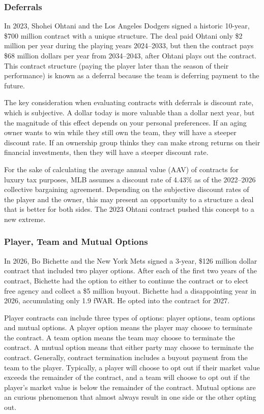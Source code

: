 \documentclass{article}
\begin{document}
      \subsubsection{\sc Deferrals}

        In 2023, Shohei Ohtani and the Los Angeles Dodgers signed a historic 10-year, \$700 million contract with a unique structure. The deal paid Ohtani only \$2 million per year during the playing years 2024--2033, but then the contract pays \$68 million dollars per year from 2034--2043, after Ohtani plays out the contract. This contract structure (paying the player later than the season of their performance) is known as a deferral because the team is deferring payment to the future.

        The key consideration when evaluating contracts with deferrals is discount rate, which is subjective. A dollar today is more valuable than a dollar next year, but the magnitude of this effect depends on your personal preferences. If an aging owner wants to win while they still own the team, they will have a steeper discount rate. If an ownership group thinks they can make strong returns on their financial investments, then they will have a steeper discount rate.

        For the sake of calculating the average annual value (AAV) of contracts for luxury tax purposes, MLB assumes a discount rate of 4.43\% as of the 2022--2026 collective bargaining agreement. Depending on the subjective discount rates of the player and the owner, this may present an opportunity to a structure a deal that is better for both sides. The 2023 Ohtani contract pushed this concept to a new extreme.

      \subsubsection{\sc Player, Team and Mutual Options}

        In 2026, Bo Bichette and the New York Mets signed a 3-year, \$126 million dollar contract that included two player options. After each of the first two years of the contract, Bichette had the option to either to continue the contract or to elect free agency and collect a \$5 million buyout. Bichette had a disappointing year in 2026, accumulating only 1.9 fWAR. He opted into the contract for 2027.

        Player contracts can include three types of options: player options, team options and mutual options. A player option means the player may choose to terminate the contract. A team option means the team may choose to terminate the contract. A mutual option means that either party may choose to terminate the contract. Generally, contract termination includes a buyout payment from the team to the player. Typically, a player will choose to opt out if their market value exceeds the remainder of the contract, and a team will choose to opt out if the player's market value is below the remainder of the contract. Mutual options are an curious phenomenon that almost always result in one side or the other opting out.
\end{document}
